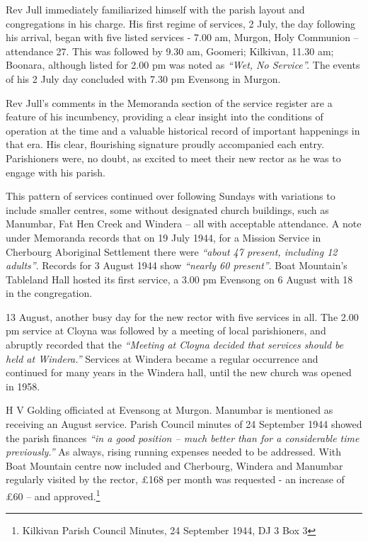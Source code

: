 Rev Jull immediately familiarized himself with the parish layout and congregations in his charge. His first regime of services, 2 July, the day following his arrival, began with five listed services - 7.00 am, Murgon, Holy Communion -- attendance 27. This was followed by 9.30 am, Goomeri; Kilkivan, 11.30 am; Boonara, although listed for 2.00 pm was noted as \emph{``Wet, No Service''.} The events of his 2 July day concluded with 7.30 pm Evensong in Murgon.



Rev Jull's comments in the Memoranda section of the service register are a feature of his incumbency, providing a clear insight into the conditions of operation at the time and a valuable historical record of important happenings in that era. His clear, flourishing signature proudly accompanied each entry. Parishioners were, no doubt, as excited to meet their new rector as he was to engage with his parish.



This pattern of services continued over following Sundays with variations to include smaller centres, some without designated church buildings, such as Manumbar, Fat Hen Creek and Windera -- all with acceptable attendance. A note under Memoranda records that on 19 July 1944, for a Mission Service in Cherbourg Aboriginal Settlement there were \emph{``about 47 present, including 12 adults''}. Records for 3 August 1944 show \emph{``nearly 60 present''}. Boat Mountain's Tableland Hall hosted its first service, a 3.00 pm Evensong on 6 August with 18 in the congregation.



13 August, another busy day for the new rector with five services in all. The 2.00 pm service at Cloyna was followed by a meeting of local parishioners, and abruptly recorded that the \emph{``Meeting at Cloyna decided that services should be held at Windera.''} Services at Windera became a regular occurrence and continued for many years in the Windera hall, until the new church was opened in 1958.



H V Golding officiated at Evensong at Murgon. Manumbar is mentioned as receiving an August service. Parish Council minutes of 24 September 1944 showed the parish finances \emph{``in a good position -- much better than for a considerable time previously.''} As always, rising running expenses needed to be addressed. With Boat Mountain centre now included and Cherbourg, Windera and Manumbar regularly visited by the rector, \pounds168 per month was requested - an increase of \pounds60 -- and approved.\footnote{Kilkivan Parish Council Minutes, 24 September 1944, DJ 3 Box 3}


